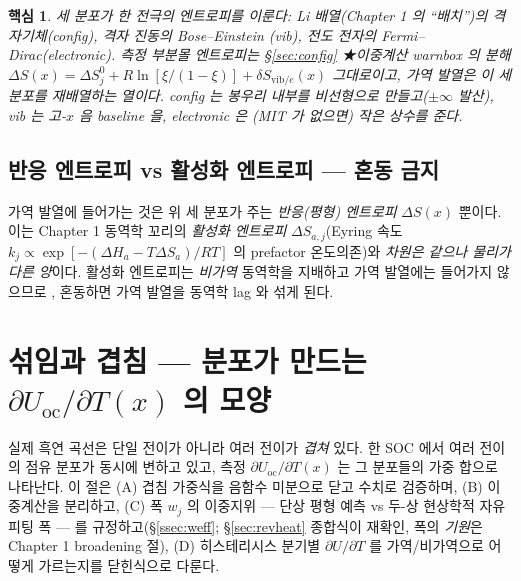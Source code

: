 \documentclass[11pt,a4paper]{article}
\newtheorem*{keybox}{핵심}
\newcommand{\oc}{\mathrm{oc}}
\newcommand{\vib}{\mathrm{vib}}
\begin{document}
\begin{keybox}
세 분포가 한 전극의 엔트로피를 이룬다: Li 배열(Chapter 1 의 ``배치'')의 \emph{격자기체}(config), 격자 진동의 \emph{Bose--Einstein}
(vib), 전도 전자의 \emph{Fermi--Dirac}(electronic). 측정 부분몰 엔트로피는 \S\ref{sec:config} ★이중계산
warnbox 의 분해 $\Delta S(x)=\Delta S^0_j+R\ln[\xi/(1-\xi)]+\delta S_{\vib/e}(x)$ 그대로이고, 가역 발열은 이 세 분포를
재배열하는 열이다. config 는 봉우리 \emph{내부}를 비선형으로 만들고($\pm\infty$ 발산), vib 는 고-$x$ 음
baseline 을, electronic 은 (MIT 가 없으면) 작은 상수를 준다.
\end{keybox}

\subsection{반응 엔트로피 vs 활성화 엔트로피 — 혼동 금지}
가역 발열에 들어가는 것은 위 세 분포가 주는 \emph{반응(평형) 엔트로피} $\Delta S(x)$ 뿐이다. 이는 Chapter 1
동역학 꼬리의 \emph{활성화 엔트로피} $\Delta S_{a,j}$(Eyring 속도 $k_j\propto\exp[-(\Delta H_a-T\Delta S_a)/RT]$
의 prefactor 온도의존)와 \emph{차원은 같으나 물리가 다른 양}이다. 활성화 엔트로피는 \emph{비가역} 동역학을
지배하고 가역 발열에는 들어가지 않으므로 \cite{msmr_partI}, 혼동하면 가역 발열을 동역학 lag 와 섞게 된다.

\section{섞임과 겹침 — 분포가 만드는 $\partial U_\oc/\partial T(x)$ 의 모양}\label{sec:mixing}
실제 흑연 곡선은 단일 전이가 아니라 여러 전이가 \emph{겹쳐} 있다. 한 SOC 에서 여러 전이의 점유 분포가 동시에
변하고 있고, 측정 $\partial U_\oc/\partial T(x)$ 는 그 분포들의 가중 합으로 나타난다. 이 절은 (A) 겹침 가중식을
음함수 미분으로 닫고 수치로 검증하며, (B) 이중계산을 분리하고, (C) 폭 $w_j$ 의 이중지위 — 단상 평형 예측 vs
두-상 현상학적 자유 피팅 폭 — 를 규정하고(\S\ref{ssec:weff}; \S\ref{sec:revheat} 종합식이 재확인, 폭의
\emph{기원}은 Chapter 1 broadening 절), (D) 히스테리시스 분기별 $\partial U/\partial T$ 를
가역/비가역으로 어떻게 가르는지를 닫힌식으로 다룬다.
\end{document}
